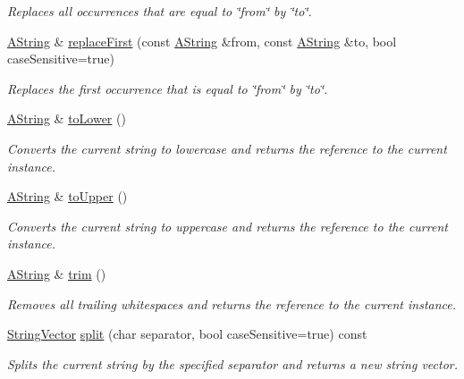 \begin{DoxyCompactItemize}
\begin{DoxyCompactList}\small\item\em Replaces all occurrences that are equal to \char`\"{}from\char`\"{} by \char`\"{}to\char`\"{}. \end{DoxyCompactList}\item 
\mbox{\hyperlink{class_a_string}{A\+String}} \& \mbox{\hyperlink{class_a_string_af28290e59b97962a365e89e475376ac7}{replace\+First}} (const \mbox{\hyperlink{class_a_string}{A\+String}} \&from, const \mbox{\hyperlink{class_a_string}{A\+String}} \&to, bool case\+Sensitive=true)
\begin{DoxyCompactList}\small\item\em Replaces the first occurrence that is equal to \char`\"{}from\char`\"{} by \char`\"{}to\char`\"{}. \end{DoxyCompactList}\item 
\mbox{\hyperlink{class_a_string}{A\+String}} \& \mbox{\hyperlink{class_a_string_aade3f9bf7dfe337df49f7f094068379e}{to\+Lower}} ()
\begin{DoxyCompactList}\small\item\em Converts the current string to lowercase and returns the reference to the current instance. \end{DoxyCompactList}\item 
\mbox{\hyperlink{class_a_string}{A\+String}} \& \mbox{\hyperlink{class_a_string_af4def080314da5a03fcead8b7cf822bc}{to\+Upper}} ()
\begin{DoxyCompactList}\small\item\em Converts the current string to uppercase and returns the reference to the current instance. \end{DoxyCompactList}\item 
\mbox{\hyperlink{class_a_string}{A\+String}} \& \mbox{\hyperlink{class_a_string_a2ba7d2ba7eb61998453f7e7ce364d441}{trim}} ()
\begin{DoxyCompactList}\small\item\em Removes all trailing whitespaces and returns the reference to the current instance. \end{DoxyCompactList}\item 
\mbox{\hyperlink{class_string_vector}{String\+Vector}} \mbox{\hyperlink{class_a_string_a025f539406111e39b0bf54a2ffcda8aa}{split}} (char separator, bool case\+Sensitive=true) const
\begin{DoxyCompactList}\small\item\em Splits the current string by the specified separator and returns a new string vector. \end{DoxyCompactList}\item 

\end{DoxyCompactItemize}
